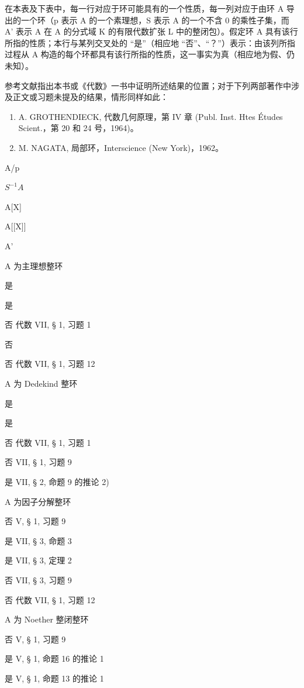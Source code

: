 
在本表及下表中，每一行对应于环可能具有的一个性质，每一列对应于由环 A 导出的一个环（p 表示 A 的一个素理想，S 表示 A 的一个不含 0 的乘性子集，而 A' 表示 A 在 A 的分式域 K 的有限代数扩张 L 中的整闭包）。假定环 A 具有该行所指的性质；本行与某列交叉处的 ``是''（相应地 ``否''、``？''）表示：由该列所指过程从 A 构造的每个环都具有该行所指的性质，这一事实为真（相应地为假、仍未知）。

参考文献指出本书或《代数》一书中证明所述结果的位置；对于下列两部著作中涉及正文或习题未提及的结果，情形同样如此：

\begin{enumerate}
\def\labelenumi{(\arabic{enumi})}
\item
  A. GROTHENDIECK, 代数几何原理，第 IV 章 (Publ. Inst. Htes Études Scient.，第 20 和 24 号，1964)。
\item
  M. NAGATA, 局部环，Interscience (New York)，1962。
\end{enumerate}

A/p

\(S^{-1}A\)

A{[}X{]}

A{[}{[}X{]}{]}

A'

A 为主理想整环

是

是

否 代数 VII, § 1, 习题 1

否

否 代数 VII, § 1, 习题 12

A 为 Dedekind 整环

是

是

否 代数 VII, § 1, 习题 1

否 VII, § 1, 习题 9

是 VII, § 2, 命题 9 的推论 2)

A 为因子分解整环

否 V, § 1, 习题 9

是 VII, § 3, 命题 3

是 VII, § 3, 定理 2

否 VII, § 3, 习题 9

否 代数 VII, § 1, 习题 12

A 为 Noether 整闭整环

否 V, § 1, 习题 9

是 V, § 1, 命题 16 的推论 1

是 V, § 1, 命题 13 的推论 1

